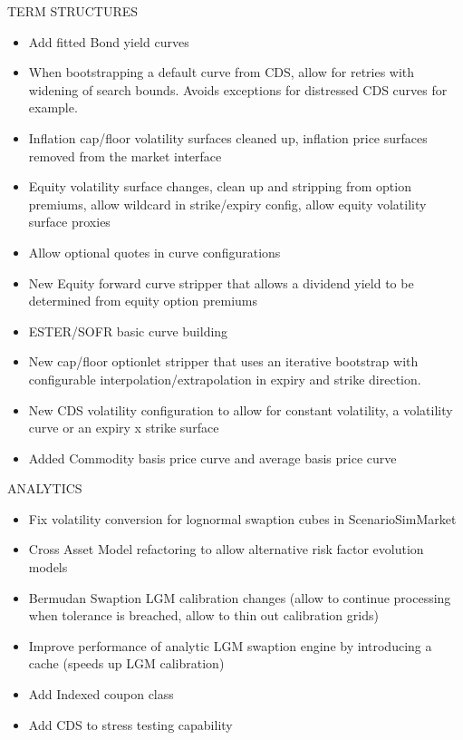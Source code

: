 \documentclass[12pt, a4paper]{article}
\begin{document}
\bigskip
TERM STRUCTURES

\begin{itemize}
\item Add fitted Bond yield curves
\item When bootstrapping a default curve from CDS, allow for retries with widening of
  search bounds. Avoids exceptions
  for distressed CDS curves for example.
\item Inflation cap/floor volatility surfaces cleaned up, inflation price surfaces removed
  from the market interface
\item Equity volatility surface changes, clean up and stripping from option premiums,
  allow wildcard in strike/expiry config, allow equity volatility surface proxies
\item Allow optional quotes in curve configurations
\item New Equity forward curve stripper that allows a dividend yield to be determined from
  equity option premiums
\item ESTER/SOFR basic curve building
\item New cap/floor optionlet stripper that uses an iterative bootstrap with configurable
  interpolation/extrapolation
  in expiry and strike direction.
\item New CDS volatility configuration to allow for constant volatility, a volatility
  curve or an expiry x strike surface
\item Added Commodity basis price curve and average basis price curve
\end{itemize}

\bigskip
ANALYTICS

\begin{itemize}
\item Fix volatility conversion for lognormal swaption cubes in ScenarioSimMarket
\item Cross Asset Model refactoring to allow alternative risk factor evolution models 
\item Bermudan Swaption LGM calibration changes (allow to continue processing when
  tolerance is breached, allow to thin out calibration grids)
\item Improve performance of analytic LGM swaption engine by introducing a cache
  (speeds up LGM calibration)
\item Add Indexed coupon class
\item Add CDS to stress testing capability
\end{itemize}
\end{document}

